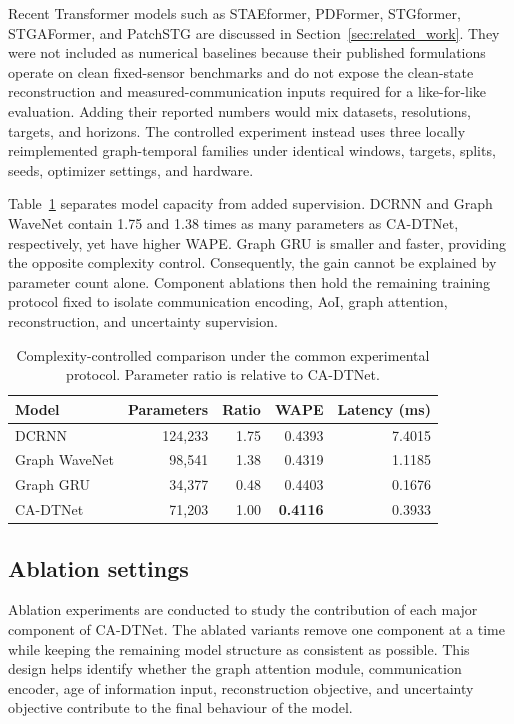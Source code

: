 \documentclass[pdflatex,sn-mathphys-num]{sn-jnl}%
\newenvironment{changed}{}{}
\theoremstyle{thmstyleone}%
\theoremstyle{thmstyletwo}%
\theoremstyle{thmstylethree}%
\begin{document}
\begin{changed}
Recent Transformer models such as STAEformer, PDFormer, STGformer, STGAFormer, and PatchSTG are discussed in Section~\ref{sec:related_work}. They were not included as numerical baselines because their published formulations operate on clean fixed-sensor benchmarks and do not expose the clean-state reconstruction and measured-communication inputs required for a like-for-like evaluation. Adding their reported numbers would mix datasets, resolutions, targets, and horizons. The controlled experiment instead uses three locally reimplemented graph-temporal families under identical windows, targets, splits, seeds, optimizer settings, and hardware.

Table~\ref{tab:complexity_control} separates model capacity from added supervision. DCRNN and Graph WaveNet contain 1.75 and 1.38 times as many parameters as CA-DTNet, respectively, yet have higher WAPE. Graph GRU is smaller and faster, providing the opposite complexity control. Consequently, the gain cannot be explained by parameter count alone. Component ablations then hold the remaining training protocol fixed to isolate communication encoding, AoI, graph attention, reconstruction, and uncertainty supervision.

\begin{table}[!htbp]
\caption{Complexity-controlled comparison under the common experimental protocol. Parameter ratio is relative to CA-DTNet.}
\label{tab:complexity_control}
\centering
\footnotesize
\begin{tabular}{lrrrr}
\toprule
Model & Parameters & Ratio & WAPE & Latency (ms) \\
\midrule
DCRNN & 124,233 & 1.75 & 0.4393 & 7.4015 \\
Graph WaveNet & 98,541 & 1.38 & 0.4319 & 1.1185 \\
Graph GRU & 34,377 & 0.48 & 0.4403 & 0.1676 \\
CA-DTNet & 71,203 & 1.00 & \textbf{0.4116} & 0.3933 \\
\bottomrule
\end{tabular}
\end{table}
\end{changed}

\subsection{Ablation settings}
\label{subsec:ablation_settings}

Ablation experiments are conducted to study the contribution of each major component of CA-DTNet. The ablated variants remove one component at a time while keeping the remaining model structure as consistent as possible. This design helps identify whether the graph attention module, communication encoder, age of information input, reconstruction objective, and uncertainty objective contribute to the final behaviour of the model.
\end{document}
